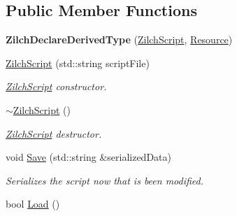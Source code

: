 \subsection*{Public Member Functions}
\begin{DoxyCompactItemize}
\item 
\hypertarget{classDCEngine_1_1ZilchScript_a78def579a02170a045f8c181d31dd7a7}{{\bfseries Zilch\-Declare\-Derived\-Type} (\hyperlink{classDCEngine_1_1ZilchScript}{Zilch\-Script}, \hyperlink{classDCEngine_1_1Resource}{Resource})}\label{classDCEngine_1_1ZilchScript_a78def579a02170a045f8c181d31dd7a7}

\item 
\hyperlink{classDCEngine_1_1ZilchScript_a153d61b7114bdd4cf36d87caf6455549}{Zilch\-Script} (std\-::string script\-File)
\begin{DoxyCompactList}\small\item\em \hyperlink{classDCEngine_1_1ZilchScript}{Zilch\-Script} constructor. \end{DoxyCompactList}\item 
\hypertarget{classDCEngine_1_1ZilchScript_a6f7f3f5b23037729a0f4ccb99eec565e}{\hyperlink{classDCEngine_1_1ZilchScript_a6f7f3f5b23037729a0f4ccb99eec565e}{$\sim$\-Zilch\-Script} ()}\label{classDCEngine_1_1ZilchScript_a6f7f3f5b23037729a0f4ccb99eec565e}

\begin{DoxyCompactList}\small\item\em \hyperlink{classDCEngine_1_1ZilchScript}{Zilch\-Script} destructor. \end{DoxyCompactList}\item 
\hypertarget{classDCEngine_1_1ZilchScript_aa7fb583c57c5b439efc79f79f418dc35}{void \hyperlink{classDCEngine_1_1ZilchScript_aa7fb583c57c5b439efc79f79f418dc35}{Save} (std\-::string \&serialized\-Data)}\label{classDCEngine_1_1ZilchScript_aa7fb583c57c5b439efc79f79f418dc35}

\begin{DoxyCompactList}\small\item\em Serializes the script now that is been modified. \end{DoxyCompactList}\item 
\hypertarget{classDCEngine_1_1ZilchScript_afc162c3e0cf290bfba3705bfceb39a39}{bool \hyperlink{classDCEngine_1_1ZilchScript_afc162c3e0cf290bfba3705bfceb39a39}{Load} ()}\label{classDCEngine_1_1ZilchScript_afc162c3e0cf290bfba3705bfceb39a39}


\end{DoxyCompactItemize}
